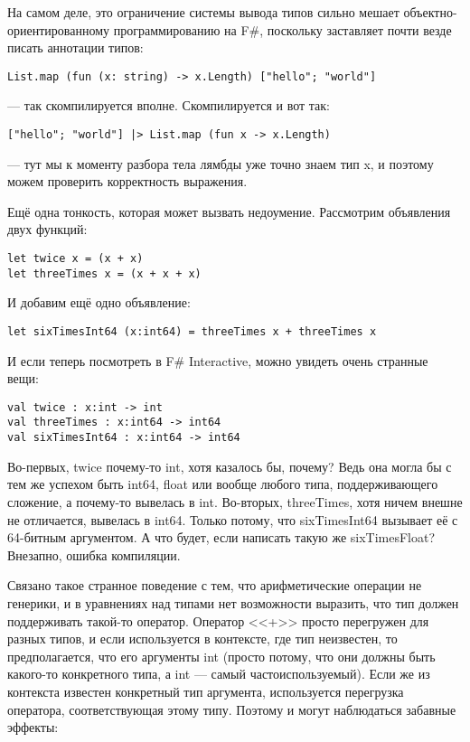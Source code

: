 \documentclass{../../text-style}
\begin{document}
На самом деле, это ограничение системы вывода типов сильно мешает объектно-ориентированному программированию на F\#, поскольку заставляет почти везде писать аннотации типов:

\begin{verbatim}
List.map (fun (x: string) -> x.Length) ["hello"; "world"] 
\end{verbatim}

--- так скомпилируется вполне. Скомпилируется и вот так:

\begin{verbatim}
["hello"; "world"] |> List.map (fun x -> x.Length)  
\end{verbatim}

--- тут мы к моменту разбора тела лямбды уже точно знаем тип x, и поэтому можем проверить корректность выражения.

Ещё одна тонкость, которая может вызвать недоумение. Рассмотрим объявления двух функций:

\begin{verbatim}
let twice x = (x + x)
let threeTimes x = (x + x + x)
\end{verbatim}

И добавим ещё одно объявление:

\begin{verbatim}
let sixTimesInt64 (x:int64) = threeTimes x + threeTimes x
\end{verbatim}

И если теперь посмотреть в F\# Interactive, можно увидеть очень странные вещи:

\begin{verbatim}
val twice : x:int -> int
val threeTimes : x:int64 -> int64
val sixTimesInt64 : x:int64 -> int64
\end{verbatim}

Во-первых, twice почему-то int, хотя казалось бы, почему? Ведь она могла бы с тем же успехом быть int64, float или вообще любого типа, поддерживающего сложение, а почему-то вывелась в int. Во-вторых, threeTimes, хотя ничем внешне не отличается, вывелась в int64. Только потому, что sixTimesInt64 вызывает её с 64-битным аргументом. А что будет, если написать такую же sixTimesFloat? Внезапно, ошибка компиляции.

Связано такое странное поведение с тем, что арифметические операции не генерики, и в уравнениях над типами нет возможности выразить, что тип должен поддерживать такой-то оператор. Оператор <<+>> просто перегружен для разных типов, и если используется в контексте, где тип неизвестен, то предполагается, что его аргументы int (просто потому, что они должны быть какого-то конкретного типа, а int --- самый частоиспользуемый). Если же из контекста известен конкретный тип аргумента, используется перегрузка оператора, соответствующая этому типу. Поэтому и могут наблюдаться забавные эффекты:
\end{document}
